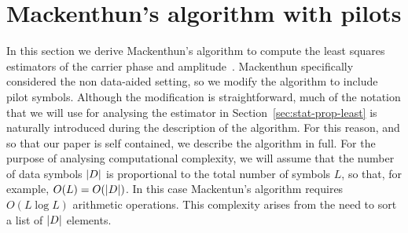 \documentclass[journal]{IEEEtran}
\begin{document}
\section{Mackenthun's algorithm with pilots}\label{sec:least-squar-estim}

In this section we derive Mackenthun's algorithm to compute the least squares estimators of the carrier phase and amplitude~\cite{Mackenthun1994}.  Mackenthun specifically considered the non data-aided setting, so we modify the algorithm to include pilot symbols.  Although the modification is straightforward, much of the notation that we will use for analysing the estimator in Section~\ref{sec:stat-prop-least} is naturally introduced during the description of the algorithm.  For this reason, and so that our paper is self contained, we describe the algorithm in full.  For the purpose of analysing computational complexity, we will assume that the number of data symbols ${\left\vert D \right\vert}$ is proportional to the total number of symbols $L$, so that, for example, $O(L) = O({\left\vert D \right\vert})$.  In this case Mackentun's algorithm requires $O(L \log L)$ arithmetic operations.  This complexity arises from the need to sort a list of ${\left\vert D \right\vert}$ elements.  

\end{document}
